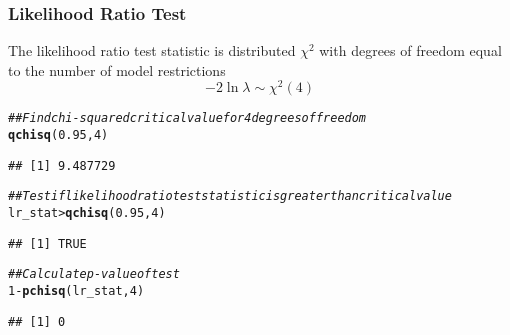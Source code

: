 \documentclass{beamer}\usepackage[]{graphicx}\usepackage[]{color}
\makeatletter
\newcommand{\hlnum}[1]{\textcolor[rgb]{0.686,0.059,0.569}{#1}}%
\newcommand{\hlcom}[1]{\textcolor[rgb]{0.678,0.584,0.686}{\textit{#1}}}%
\newcommand{\hlopt}[1]{\textcolor[rgb]{0,0,0}{#1}}%
\newcommand{\hlstd}[1]{\textcolor[rgb]{0.345,0.345,0.345}{#1}}%
\newcommand{\hlkwd}[1]{\textcolor[rgb]{0.737,0.353,0.396}{\textbf{#1}}}%
\newenvironment{kframe}{%
 \def\at@end@of@kframe{}%
 \ifinner\ifhmode%
  \def\at@end@of@kframe{\end{minipage}}%
  \begin{minipage}{\columnwidth}%
 \fi\fi%
 \def\FrameCommand##1{\hskip\@totalleftmargin \hskip-\fboxsep
 \colorbox{shadecolor}{##1}\hskip-\fboxsep
     \hskip-\linewidth \hskip-\@totalleftmargin \hskip\columnwidth}%
 \MakeFramed {\advance\hsize-\width
   \@totalleftmargin\z@ \linewidth\hsize
   \@setminipage}}%
 {\par\unskip\endMakeFramed%
 \at@end@of@kframe}
\newenvironment{knitrout}{}{} %
\makeatother
\begin{document}
\begin{frame}[fragile]\frametitle{Likelihood Ratio Test}
	  The likelihood ratio test statistic is distributed $\chi^2$ with degrees of freedom equal to the number of model restrictions
    $$-2 \ln \lambda \sim \chi^2(4)$$
\begin{knitrout}\footnotesize
{}\color{fgcolor}\begin{kframe}
\begin{alltt}
\hlcom{## Find chi-squared critical value for 4 degrees of freedom}
\hlkwd{qchisq}\hlstd{(}\hlnum{0.95}\hlstd{,} \hlnum{4}\hlstd{)}
\end{alltt}
\begin{verbatim}
## [1] 9.487729
\end{verbatim}
\begin{alltt}
\hlcom{## Test if likelihood ratio test statistic is greater than critical value}
\hlstd{lr_stat} \hlopt{>} \hlkwd{qchisq}\hlstd{(}\hlnum{0.95}\hlstd{,} \hlnum{4}\hlstd{)}
\end{alltt}
\begin{verbatim}
## [1] TRUE
\end{verbatim}
\begin{alltt}
\hlcom{## Calculate p-value of test}
\hlnum{1} \hlopt{-} \hlkwd{pchisq}\hlstd{(lr_stat,} \hlnum{4}\hlstd{)}
\end{alltt}
\begin{verbatim}
## [1] 0
\end{verbatim}
\end{kframe}
\end{knitrout}
\end{frame}
\end{document}
